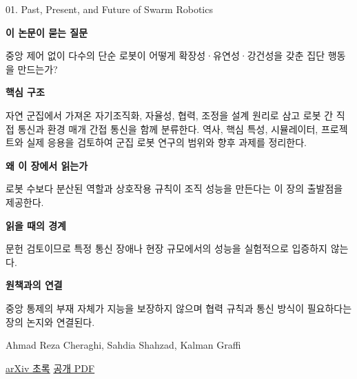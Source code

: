 \documentclass[11pt,openany]{book}
\begin{document}
\begin{termcard}{01. Past, Present, and Future of Swarm Robotics}

\par

\medskip

{\sffamily\bfseries\color{deepblue} 이 논문이 묻는 질문}\par

중앙 제어 없이 다수의 단순 로봇이 어떻게 확장성·유연성·강건성을 갖춘 집단 행동을 만드는가?

\smallskip

{\sffamily\bfseries\color{deepblue} 핵심 구조}\par

자연 군집에서 가져온 자기조직화, 자율성, 협력, 조정을 설계 원리로 삼고 로봇 간 직접 통신과 환경 매개 간접 통신을 함께 분류한다. 역사, 핵심 특성, 시뮬레이터, 프로젝트와 실제 응용을 검토하여 군집 로봇 연구의 범위와 향후 과제를 정리한다.

\smallskip

{\sffamily\bfseries\color{deepblue} 왜 이 장에서 읽는가}\par

로봇 수보다 분산된 역할과 상호작용 규칙이 조직 성능을 만든다는 이 장의 출발점을 제공한다.

\smallskip

{\sffamily\bfseries\color{coral} 읽을 때의 경계}\par

문헌 검토이므로 특정 통신 장애나 현장 규모에서의 성능을 실험적으로 입증하지 않는다.

\smallskip

{\sffamily\bfseries\color{teal} 원책과의 연결}\par

중앙 통제의 부재 자체가 지능을 보장하지 않으며 협력 규칙과 통신 방식이 필요하다는 장의 논지와 연결된다.

\medskip

{\footnotesize\color{muted} Ahmad Reza Cheraghi, Sahdia Shahzad, Kalman Graffi\par

\href{https://arxiv.org/abs/2101.00671}{arXiv 초록} \quad \href{https://arxiv.org/pdf/2101.00671}{공개 PDF}\par}

\end{termcard}
\end{document}
